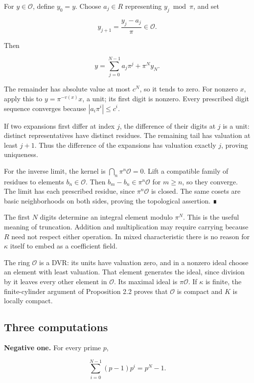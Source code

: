 \documentclass[
  english,
  11pt,
  a4paper,
]{article}
\begin{document}
For \(y\in\mathcal O\), define \(y_0=y\). Choose \(a_j\in R\)
representing \(y_j\bmod\pi\), and set

\[y_{j+1}=\frac{y_j-a_j}{\pi}\in\mathcal O.\]

Then

\[y=\sum_{j=0}^{N-1}a_j\pi^j+\pi^Ny_N.\]

The remainder has absolute value at most \(c^N\), so it tends to zero.
For nonzero \(x\), apply this to \(y=\pi^{-v(x)}x\), a unit; its first
digit is nonzero. Every prescribed digit sequence converges because
\(|a_i\pi^i|\le c^i\).

If two expansions first differ at index \(j\), the difference of their
digits at \(j\) is a unit: distinct representatives have distinct
residues. The remaining tail has valuation at least \(j+1\). Thus the
difference of the expansions has valuation exactly \(j\), proving
uniqueness.

For the inverse limit, the kernel is \(\bigcap_n\pi^n\mathcal O=0\).
Lift a compatible family of residues to elements \(b_n\in\mathcal O\).
Then \(b_m-b_n\in\pi^n\mathcal O\) for \(m\ge n\), so they converge. The
limit has each prescribed residue, since \(\pi^n\mathcal O\) is closed.
The same cosets are basic neighborhoods on both sides, proving the
topological assertion. ∎

The first \(N\) digits determine an integral element modulo \(\pi^N\).
This is the useful meaning of truncation. Addition and multiplication
may require carrying because \(R\) need not respect either operation. In
mixed characteristic there is no reason for \(\kappa\) itself to embed
as a coefficient field.

The ring \(\mathcal O\) is a DVR: its units have valuation zero, and in
a nonzero ideal choose an element with least valuation. That element
generates the ideal, since division by it leaves every other element in
\(\mathcal O\). Its maximal ideal is \(\pi\mathcal O\). If \(\kappa\) is
finite, the finite-cylinder argument of Proposition 2.2 proves that
\(\mathcal O\) is compact and \(K\) is locally compact.

\subsection{Three computations}\label{NT-LOC-02--three-computations}

\textbf{Negative one.} For every prime \(p\),

\[\sum_{i=0}^{N-1}(p-1)p^i=p^N-1.\]
\end{document}
